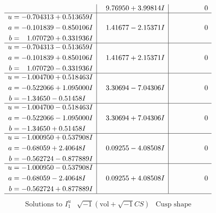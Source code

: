 \documentclass[1p]{elsarticle_modified}
\theoremstyle{definition}
\newcommand{\I}{\sqrt{-1}}
\begin{document}
$$\begin{array}{c|c|c}
 & \phantom{-}9.76950 + 3.99814 I & \phantom{-0.000000 } 0 \\ \hline\begin{aligned}
u &= -0.704313 + 0.513659 I \\
a &= -0.101839 - 0.850106 I \\
b &= \phantom{-}1.070720 + 0.331936 I\end{aligned}
 & \phantom{-}1.41677 - 2.15371 I & \phantom{-0.000000 } 0 \\ \hline\begin{aligned}
u &= -0.704313 - 0.513659 I \\
a &= -0.101839 + 0.850106 I \\
b &= \phantom{-}1.070720 - 0.331936 I\end{aligned}
 & \phantom{-}1.41677 + 2.15371 I & \phantom{-0.000000 } 0 \\ \hline\begin{aligned}
u &= -1.004700 + 0.518463 I \\
a &= -0.522066 + 1.095000 I \\
b &= -1.34650 - 0.51458 I\end{aligned}
 & \phantom{-}3.30694 - 7.04306 I & \phantom{-0.000000 } 0 \\ \hline\begin{aligned}
u &= -1.004700 - 0.518463 I \\
a &= -0.522066 - 1.095000 I \\
b &= -1.34650 + 0.51458 I\end{aligned}
 & \phantom{-}3.30694 + 7.04306 I & \phantom{-0.000000 } 0 \\ \hline\begin{aligned}
u &= -1.000950 + 0.537908 I \\
a &= -0.68059 + 2.40648 I \\
b &= -0.562724 - 0.877889 I\end{aligned}
 & \phantom{-}0.09255 - 4.08508 I & \phantom{-0.000000 } 0 \\ \hline\begin{aligned}
u &= -1.000950 - 0.537908 I \\
a &= -0.68059 - 2.40648 I \\
b &= -0.562724 + 0.877889 I\end{aligned}
 & \phantom{-}0.09255 + 4.08508 I & \phantom{-0.000000 } 0\\
 \hline 
 \end{array}$$\newpage$$\begin{array}{c|c|c}  
\text{Solutions to }I^u_{1}& \I (\text{vol} + \sqrt{-1}CS) & \text{Cusp shape}\\

\end{array}$$
\end{document}
